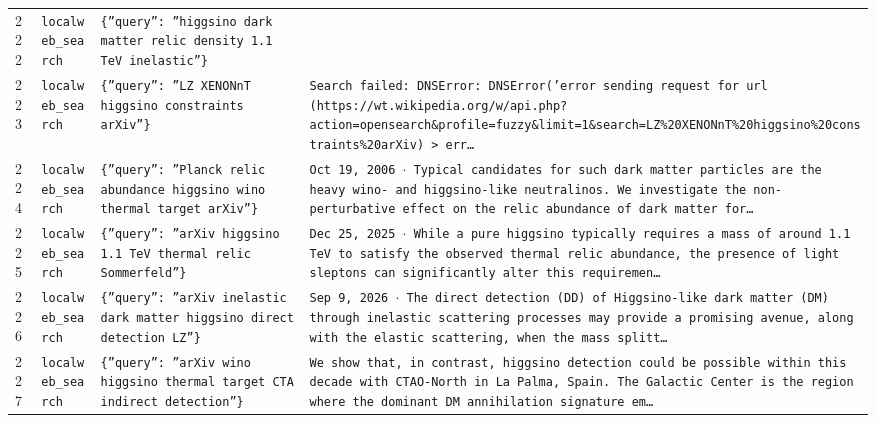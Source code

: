 \documentclass[11pt,a4paper]{article}
\begin{document}
\begin{longtable}{@{}p{}p{}p{}p{}@{}}
222 & \texttt{local}\newline\texttt{web\_\allowbreak{}search} & \texttt{\{''query'':\allowbreak{} ''higgsino dark matter relic density 1.1 TeV inelastic''\}\allowbreak{}} & \texttt{} \\
223 & \texttt{local}\newline\texttt{web\_\allowbreak{}search} & \texttt{\{''query'':\allowbreak{} ''LZ XENONnT higgsino constraints arXiv''\}\allowbreak{}} & \texttt{Search failed:\allowbreak{} DNSError:\allowbreak{} DNSError('error sending request for url (https:\allowbreak{}/\allowbreak{}/\allowbreak{}wt.wikipedia.org/\allowbreak{}w/\allowbreak{}api.php?action=\allowbreak{}opensearch\&profile=\allowbreak{}fuzzy\&limit=\allowbreak{}1\&search=\allowbreak{}LZ\%20XENONnT\%20higgsino\%20constraints\%20arXiv)\allowbreak{} \textgreater{}\allowbreak{} err\ldots{}\allowbreak{}} \\
224 & \texttt{local}\newline\texttt{web\_\allowbreak{}search} & \texttt{\{''query'':\allowbreak{} ''Planck relic abundance higgsino wino thermal target arXiv''\}\allowbreak{}} & \texttt{Oct 19,\allowbreak{} 2006 $\cdot$ Typical candidates for such dark matter particles are the heavy wino- and higgsino-like neutralinos. We investigate the non-perturbative effect on the relic abundance of dark matter for\ldots{}\allowbreak{}} \\
225 & \texttt{local}\newline\texttt{web\_\allowbreak{}search} & \texttt{\{''query'':\allowbreak{} ''arXiv higgsino 1.1 TeV thermal relic Sommerfeld''\}\allowbreak{}} & \texttt{Dec 25,\allowbreak{} 2025 $\cdot$ While a pure higgsino typically requires a mass of around 1.1 TeV to satisfy the observed thermal relic abundance,\allowbreak{} the presence of light sleptons can significantly alter this requiremen\ldots{}\allowbreak{}} \\
226 & \texttt{local}\newline\texttt{web\_\allowbreak{}search} & \texttt{\{''query'':\allowbreak{} ''arXiv inelastic dark matter higgsino direct detection LZ''\}\allowbreak{}} & \texttt{Sep 9,\allowbreak{} 2026 $\cdot$ The direct detection (DD)\allowbreak{} of Higgsino-like dark matter (DM)\allowbreak{} through inelastic scattering processes may provide a promising avenue,\allowbreak{} along with the elastic scattering,\allowbreak{} when the mass splitt\ldots{}\allowbreak{}} \\
227 & \texttt{local}\newline\texttt{web\_\allowbreak{}search} & \texttt{\{''query'':\allowbreak{} ''arXiv wino higgsino thermal target CTA indirect detection''\}\allowbreak{}} & \texttt{We show that,\allowbreak{} in contrast,\allowbreak{} higgsino detection could be possible within this decade with CTAO-North in La Palma,\allowbreak{} Spain. The Galactic Center is the region where the dominant DM annihilation signature em\ldots{}\allowbreak{}} \\

\end{longtable}
\end{document}
